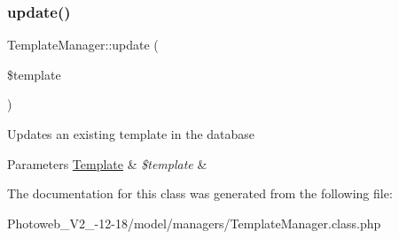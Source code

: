 \subsubsection{\texorpdfstring{update()}{update()}}
{\footnotesize\ttfamily Template\+Manager\+::update (\begin{DoxyParamCaption}\item[{}]{\$template }\end{DoxyParamCaption})}

Updates an existing template in the database 
\begin{DoxyParams}[1]{Parameters}
\hyperlink{classTemplate}{Template} & {\em \$template} & \\
\hline
\end{DoxyParams}


The documentation for this class was generated from the following file\+:\begin{DoxyCompactItemize}
\item 
Photoweb\+\_\+\+V2\+\_-\/12-\/18/model/managers/Template\+Manager.\+class.\+php\end{DoxyCompactItemize}
